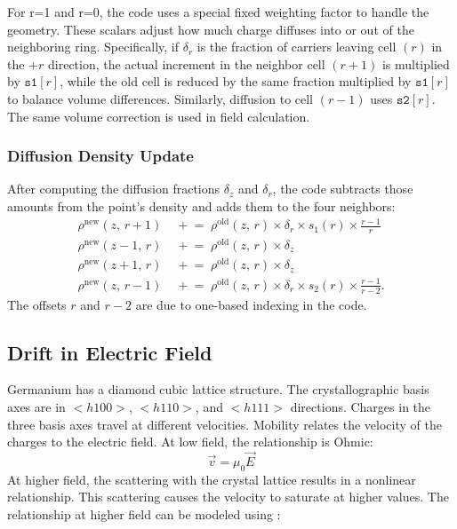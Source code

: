 For r=1 and r=0, the code uses a special fixed weighting factor to handle the geometry. These scalars adjust how much charge diffuses into or out of the neighboring ring. Specifically, if $\delta_r$ is the fraction of carriers leaving cell $(r)$ in 
the $+r$ direction, the actual increment in the neighbor cell 
$(r+1)$ is multiplied by $\texttt{s1}[r]$, while the old cell is 
reduced by the same fraction multiplied by $\texttt{s1}[r]$ to 
balance volume differences. Similarly, diffusion to cell $(r-1)$ 
uses $\texttt{s2}[r]$. The same volume correction is used in field calculation.

\subsubsection*{Diffusion Density Update}

After computing the diffusion fractions $\delta_z$ and $\delta_r$, the code subtracts those amounts from the point's density and adds them to the four neighbors:
\begin{align}
  \rho^{\mathrm{new}}(z,\,r+1) &\;\mathrel{+}= \;\rho^{\mathrm{old}}(z,\,r)\times\delta_r \times s_1(r) \times \frac{r-1}{r} \label{ch3:eq:diffusion_update_1} \\
  \rho^{\mathrm{new}}(z-1,\,r) &\;\mathrel{+}= \;\rho^{\mathrm{old}}(z,\,r)\times\delta_z \label{ch3:eq:diffusion_update_2} \\
  \rho^{\mathrm{new}}(z+1,\,r) &\;\mathrel{+}= \;\rho^{\mathrm{old}}(z,\,r)\times\delta_z \label{ch3:eq:diffusion_update_3} \\
  \rho^{\mathrm{new}}(z,\,r-1) &\;\mathrel{+}= \;\rho^{\mathrm{old}}(z,\,r) \times \delta_r \times s_2(r) \times\frac{r-1}{r-2} \label{ch3:eq:diffusion_update_4}.
\end{align}
 The offsets $r$ and $r-2$ are due to one-based indexing in the code.
 
\subsection{Drift in Electric Field}
Germanium has a diamond cubic lattice structure. The crystallographic basis axes are in $<h100>$, $<h110>$, and $<h111>$ directions. Charges in the three basis axes travel at different velocities. Mobility relates the velocity of the charges to the electric field. At low field, the relationship is Ohmic:
\begin{equation}
\vec{v} = \mu_0 \vec{E}
\end{equation}
At higher field, the scattering with the crystal lattice results in a nonlinear relationship. This scattering causes the velocity to saturate at higher values. The relationship at higher field can be modeled using \cite{Caughey_1448053}:

